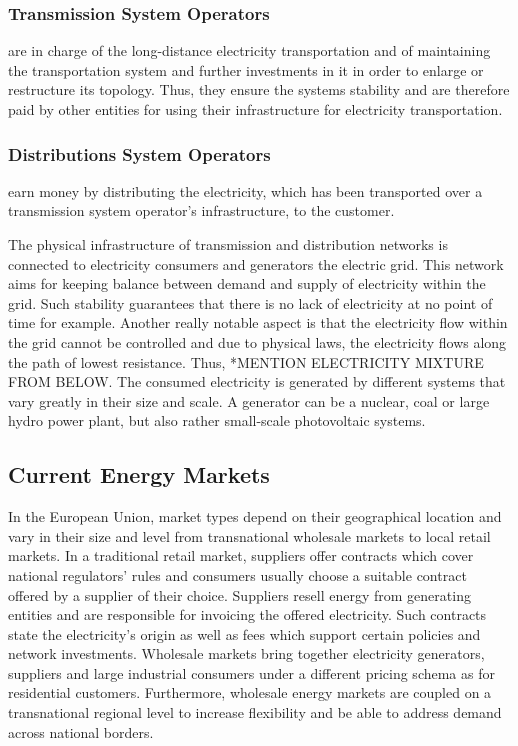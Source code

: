 \documentclass[runningheads]{llncs}
\begin{document}
\subsubsection{Transmission System Operators} are in charge of the long-distance electricity transportation and of maintaining the transportation system and further investments in it in order to enlarge or restructure its topology. Thus, they ensure the systems stability and are therefore paid by other entities for using their infrastructure for electricity transportation.

\subsubsection{Distributions System Operators} earn money by distributing the electricity, which has been transported over a transmission system operator’s infrastructure, to the customer. \newline

The physical infrastructure of transmission and distribution networks is connected to electricity consumers and generators the electric grid. This network aims for keeping balance between demand and supply of electricity within the grid. Such stability guarantees that there is no lack of electricity at no point of time for example. Another really notable aspect is that the electricity flow within the grid cannot be controlled and due to physical laws, the electricity flows along the path of lowest resistance. Thus, *MENTION ELECTRICITY MIXTURE FROM BELOW.
The consumed electricity is generated by different systems that vary greatly in their size and scale. A generator can be a nuclear, coal or large hydro power plant, but also rather small-scale photovoltaic systems. \cite{eu_energy_market}


\subsection{Current Energy Markets}
In the European Union, market types depend on their geographical location and vary in their size and level from transnational wholesale markets to local retail markets. In a traditional retail market, suppliers offer contracts which cover national regulators’ rules and consumers usually choose a suitable contract offered by a supplier of their choice. Suppliers resell energy from generating entities and are responsible for invoicing the offered electricity. Such contracts state the electricity’s origin as well as fees which support certain policies and network investments.
Wholesale markets bring together electricity generators, suppliers and large industrial consumers under a different pricing schema as for residential customers. Furthermore, wholesale energy markets are coupled on a transnational regional level to increase flexibility and be able to address demand across national borders.\cite{eu_energy_market}
\end{document}
